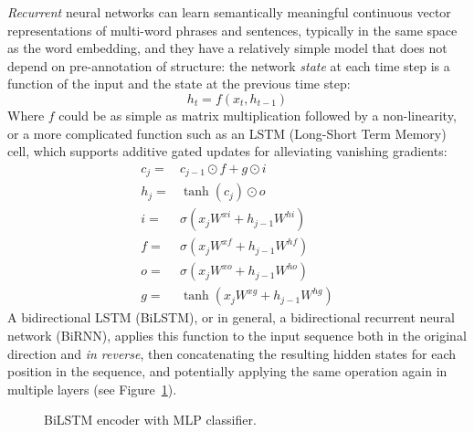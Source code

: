 \documentclass[12pt,a4paper,table]{report}
\begin{document}
\textit{Recurrent} neural networks can learn semantically meaningful
continuous vector representations of multi-word phrases and sentences,
typically in the same space as the word embedding, and they have a relatively
simple model that does not depend on pre-annotation of structure:
the network \textit{state} at each time step is a function of the input and
the state at the previous time step:
\[
  h_t=f(x_t,h_{t-1})
\]
Where $f$ could be as simple as matrix multiplication followed by a non-linearity,
or a more complicated function such as an LSTM (Long-Short Term Memory) cell,
which supports additive gated updates for alleviating vanishing gradients:
\begin{align*}
    c_j =& c_{j-1} \odot f  + g\odot i \\
    h_j =& \tanh(c_j) \odot o            \\
    i =& \sigma(x_jW^{xi} + h_{j-1}W^{hi}) \\
    f =& \sigma(x_jW^{xf} + h_{j-1}W^{hf}) \\
    o =& \sigma(x_jW^{xo} + h_{j-1}W^{ho}) \\
    g =& \tanh(x_jW^{xg} + h_{j-1}W^{hg})
\end{align*}
A bidirectional LSTM (BiLSTM), or in general, a bidirectional recurrent neural network (BiRNN),
applies this function to the input sequence both in the original direction and
\textit{in reverse}, then concatenating the resulting hidden states for each position
in the sequence, and potentially applying the same operation again in multiple layers
(see Figure~\ref{fig:bilstm}).

\begin{figure}\centering
{}
\caption{BiLSTM encoder with MLP classifier.}\label{fig:bilstm}
\end{figure}
\end{document}
